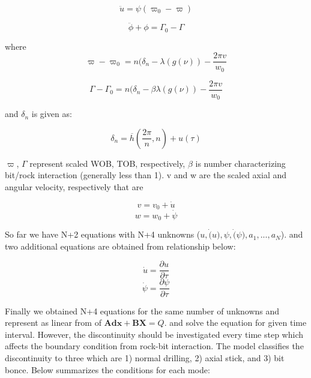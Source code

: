 \begin{equation}\label{GE1_}
  \ddot{u} = \psi(\varpi_0 - \varpi)
\end{equation}

\begin{equation}\label{GE2_}
  \ddot{\phi} + \phi = \Gamma_0 - \Gamma
\end{equation}

where 
\begin{equation}\label{GE1}
  \varpi-\varpi_0 = n(\delta_n - \lambda(g(\nu)) - \frac{2\pi v}{w_0}
\end{equation}

\begin{equation}\label{GE2}
  \Gamma-\Gamma_0 = n(\delta_n -\beta \lambda(g(\nu)) - \frac{2\pi v}{w_0}
\end{equation}

and $\delta_n$ is given as:

\begin{equation}\label{deltan1}
  \delta_n = \overline{h}\left(\frac{2\pi}{n}, n\right) + u(\tau)
\end{equation}

$\varpi$, $\Gamma$ represent scaled WOB, TOB, respectively,  $\beta$ is number characterizing bit/rock interaction (generally less than 1). v and w are the scaled axial and angular velocity, respectively that are

\begin{equation}\label{scaled_axial_ve}
  v = v_0 + \dot{u}
\end{equation}
\begin{equation}\label{scaled_angular_vel}
  w = w_0 + \dot{\psi}
\end{equation}

So far we have N+2 equations with N+4 unknowns ($u, \dot(u), \psi, \dot(\psi), a_1, ..., a_N$). and two additional equations are obtained from relationship below:

\begin{equation}\label{axial_dis_vel}
  \dot{u} = \frac{\partial u}{\partial \tau}
\end{equation}
\begin{equation}\label{angular_dis_vel}
  \dot{\psi} = \frac{\partial \psi}{\partial \tau}
\end{equation}

Finally we obtained N+4 equations for the same number of unknowns and represent as linear from of $\bm{Adx} + \bm{BX} = Q$. and solve the equation for given time interval. However, the discontinuity should be investigated every time step which affects the boundary condition from rock-bit interaction. The model classifies the discontinuity to three which are 1) normal drilling, 2) axial stick, and 3) bit bonce. Below summarizes the conditions for each mode:

